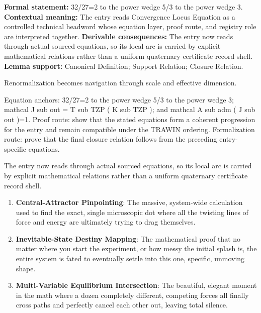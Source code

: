 \begingroup\footnotesize\setlength{\emergencystretch}{3em}\sloppy
\textbf{Formal statement:} 32/27=2 to the power wedge 5/3 to the power wedge 3. \textbf{Contextual meaning:} The entry reads Convergence Locus Equation as a controlled technical headword whose equation layer, proof route, and registry role are interpreted together. \textbf{Derivable consequences:} The entry now reads through actual sourced equations, so its local arc is carried by explicit mathematical relations rather than a uniform quaternary certificate record shell. \textbf{Lemma support:} Canonical Definition; Support Relation; Closure Relation.\par
\endgroup

Renormalization becomes navigation through scale and effective dimension.

Equation anchors: 32/27=2 to the power wedge 5/3 to the power wedge 3; mathcal J sub out = T sub TZP ( K sub TZP ); and mathcal A sub adm ( J sub out )=1. Proof route: show that the stated equations form a coherent progression for the entry and remain compatible under the TRAWIN ordering. Formalization route: prove that the final closure relation follows from the preceding entry-specific equations.

The entry now reads through actual sourced equations, so its local arc is carried by explicit mathematical relations rather than a uniform quaternary certificate record shell.
\endgroup

\begin{enumerate}[leftmargin=1.6em,itemsep=6pt,topsep=4pt]
\item \textbf{Central-Attractor Pinpointing}: The massive, system-wide calculation used to find the exact, single microscopic dot where all the twisting lines of force and energy are ultimately trying to drag themselves.
\item \textbf{Inevitable-State Destiny Mapping}: The mathematical proof that no matter where you start the experiment, or how messy the initial splash is, the entire system is fated to eventually settle into this one, specific, unmoving shape.
\item \textbf{Multi-Variable Equilibrium Intersection}: The beautiful, elegant moment in the math where a dozen completely different, competing forces all finally cross paths and perfectly cancel each other out, leaving total silence.
\end{enumerate}

